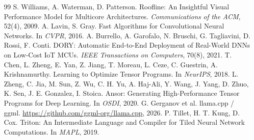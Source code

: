 \documentclass[11pt,a4paper]{ctexart}
\begin{document}
\begin{thebibliography}{99}
 S. Williams, A. Waterman, D. Patterson. Roofline: An Insightful Visual Performance Model for Multicore Architectures. \emph{Communications of the ACM}, 52(4), 2009.
 A. Lavin, S. Gray. Fast Algorithms for Convolutional Neural Networks. In \emph{CVPR}, 2016.
 A. Burrello, A. Garofalo, N. Bruschi, G. Tagliavini, D. Rossi, F. Conti. DORY: Automatic End-to-End Deployment of Real-World DNNs on Low-Cost IoT MCUs. \emph{IEEE Transactions on Computers}, 70(8), 2021.
 T. Chen, L. Zheng, E. Yan, Z. Jiang, T. Moreau, L. Ceze, C. Guestrin, A. Krishnamurthy. Learning to Optimize Tensor Programs. In \emph{NeurIPS}, 2018.
 L. Zheng, C. Jia, M. Sun, Z. Wu, C. H. Yu, A. Haj-Ali, Y. Wang, J. Yang, D. Zhuo, K. Sen, J. E. Gonzalez, I. Stoica. Ansor: Generating High-Performance Tensor Programs for Deep Learning. In \emph{OSDI}, 2020.
 G. Gerganov et al. llama.cpp / ggml. \url{https://github.com/ggml-org/llama.cpp}, 2026.
 P. Tillet, H. T. Kung, D. Cox. Triton: An Intermediate Language and Compiler for Tiled Neural Network Computations. In \emph{MAPL}, 2019.
\end{thebibliography}
\end{document}
